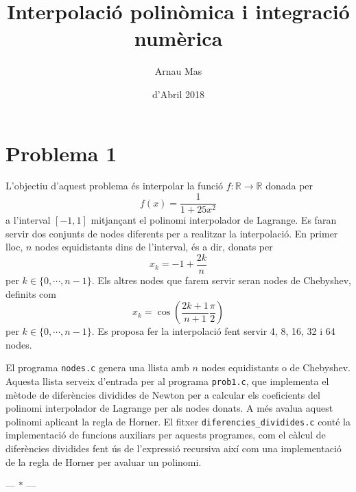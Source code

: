 \documentclass[12pt]{article}
\title{\sffamily {\bfseries Pràctica 3:} Interpolació polinòmica i integració numèrica}
\author{\sffamily Arnau Mas}
\date{\sffamily 24 d'Abril 2018}
\numberwithin{table}{section}
\numberwithin{figure}{section}
\numberwithin{equation}{section}
\newcommand{\R}{\mathbb{R}}
\newcommand{\parbreak}{
	\begin{center}
		--- $\ast$ ---
	\end{center} 
}
\begin{document}
\maketitle

\section{Problema 1}

L'objectiu d'aquest problema és interpolar la funció \( f \colon \R \to \R \) donada per
\begin{equation*}
	f(x) = \frac{1}{1 + 25x^2}
\end{equation*}
a l'interval \( [-1,1] \) mitjançant el polinomi interpolador de Lagrange. Es faran servir dos conjunts de nodes diferents per a realitzar la interpolació. En primer lloc, \( n \) nodes equidistants dins de l'interval, és a dir, donats per
\begin{equation*}
	x_k = -1 + \frac{2k}{n}
\end{equation*}
per \( k \in \{0, \cdots, n-1\} \). Els altres nodes que farem servir seran nodes de Chebyshev, definits com
\begin{equation*}
	x_k = \cos{\left(\frac{2k+1}{n+1} \frac{\pi}{2}\right)}
\end{equation*}
per \( k \in \{0, \cdots, n-1\} \). Es proposa fer la interpolació fent servir 4, 8, 16, 32 i 64 nodes. 

El programa \texttt{nodes.c} genera una llista amb \( n \) nodes equidistants o de Chebyshev. Aquesta llista serveix d'entrada per al programa \texttt{prob1.c}, que implementa el mètode de diferències dividides de Newton per a calcular els coeficients del polinomi interpolador de Lagrange per als nodes donats. A més avalua aquest polinomi aplicant la regla de Horner. El fitxer \texttt{diferencies\_dividides.c} conté la implementació de funcions auxiliars per aquests programes, com el càlcul de diferències dividides fent ús de l'expressió recursiva així com una implementació de la regla de Horner per avaluar un polinomi. 

\parbreak
\end{document}
